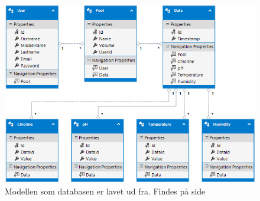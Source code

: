 \begin{figure}[H]
\centering
\includegraphics[width=\linewidth]{figs/db_model}
\caption{Modellen som databasen er lavet ud fra. Findes på side}
\label{fig:dbmodel}
\end{figure}